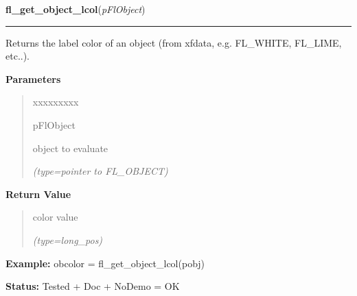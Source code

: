 \hspace{.8\funcindent}\begin{boxedminipage}{\funcwidth}

    \raggedright \textbf{fl\_get\_object\_lcol}(\textit{pFlObject})

    \vspace{-1.5ex}

    \rule{\textwidth}{0.5\fboxrule}
\setlength{\parskip}{2ex}
    Returns the label color of an object (from xfdata, e.g. FL\_WHITE, 
    FL\_LIME, etc..).

\setlength{\parskip}{1ex}
      \textbf{Parameters}
      \vspace{-1ex}

      \begin{quote}
        \begin{Ventry}{xxxxxxxxx}

          \item[pFlObject]

          object to evaluate

            {\it (type=pointer to FL\_OBJECT)}

        \end{Ventry}

      \end{quote}

      \textbf{Return Value}
    \vspace{-1ex}

      \begin{quote}
      color value

      {\it (type=long\_pos)}

      \end{quote}

\textbf{Example:} obcolor = fl\_get\_object\_lcol(pobj)



\textbf{Status:} Tested + Doc + NoDemo = OK



    \end{boxedminipage}

    \label{xformslib:flbasic:fl_set_object_return}

    \vspace{0.5ex}

